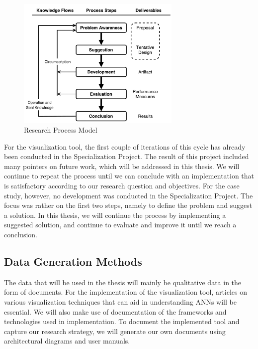 \begin{figure}[h!]
    \centering
        \includegraphics[width=0.7\textwidth]{fig/dsr-cycle.pdf}
        \caption{Research Process Model}
        \label{dsr-cycle}
\end{figure}

\noindent For the visualization tool, the first couple of iterations of this cycle has already been conducted in the Specialization Project. The result of this project included many pointers on future work, which will be addressed in this thesis. We will continue to repeat the process until we can conclude with an implementation that is satisfactory according to our research question and objectives. For the case study, however, no development was conducted in the Specialization Project. The focus was rather on the first two steps, namely to define the problem and suggest a solution. In this thesis, we will continue the process by implementing a suggested solution, and continue to evaluate and improve it until we reach a conclusion.\\

\subsection{Data Generation Methods}

The data that will be used in the thesis will mainly be qualitative data in the form of documents. For the implementation of the visualization tool, articles on various visualization techniques that can aid in understanding ANNs will be essential. We will also make use of documentation of the frameworks and technologies used in implementation. To document the implemented tool and capture our research strategy, we will generate our own documents using architectural diagrams and user manuals. \\

